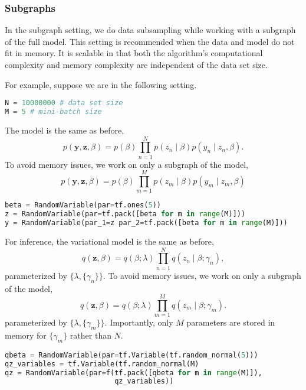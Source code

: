 \subsubsection{Subgraphs}

In the subgraph setting, we do data subsampling while working with a
subgraph of the full model. This setting is recommended when the data
and model do not fit in memory. It is scalable in that both the
algorithm's computational complexity and memory complexity are
independent of the data set size.

For example, suppose we are in the following setting.
\begin{lstlisting}[language=Python]
N = 10000000 # data set size
M = 5 # mini-batch size
\end{lstlisting}
The model is the same as before,
\begin{equation*}
p(\mathbf{y}, \mathbf{z}, \beta)
= p(\beta) \prod_{n=1}^N p(z_n \mid \beta) p(y_n \mid z_n, \beta).
\end{equation*}
To avoid memory issues, we work on only a subgraph of the model,
\begin{equation*}
p(\mathbf{y}, \mathbf{z}, \beta)
= p(\beta) \prod_{m=1}^M p(z_m \mid \beta) p(y_m \mid z_m, \beta)
\end{equation*}
\begin{lstlisting}[language=Python]
beta = RandomVariable(par=tf.ones(5))
z = RandomVariable(par=tf.pack([beta for m in range(M)]))
y = RandomVariable(par_1=z par_2=tf.pack([beta for m in range(M)]))

\end{lstlisting}
For inference, the variational model is the same as before,
\begin{equation*}
q(\mathbf{z}, \beta) =
q(\beta; \lambda) \prod_{n=1}^N q(z_n \mid \beta; \gamma_n),
\end{equation*}
parameterized by $\{\lambda, \{\gamma_n\}\}$.
To avoid memory issues, we work on only a subgraph of the model,
\begin{equation*}
q(\mathbf{z}, \beta) =
q(\beta; \lambda) \prod_{m=1}^M q(z_m \mid \beta; \gamma_m).
\end{equation*}
parameterized by $\{\lambda, \{\gamma_m\}\}$. Importantly, only $M$
parameters are stored in memory for $\{\gamma_m\}$ rather than $N$.
\begin{lstlisting}[language=Python]
qbeta = RandomVariable(par=tf.Variable(tf.random_normal(5)))
qz_variables = tf.Variable(tf.random_normal(M)
qz = RandomVariable(par=f(tf.pack([qbeta for m in range(M)]),
                          qz_variables))
\end{lstlisting}
